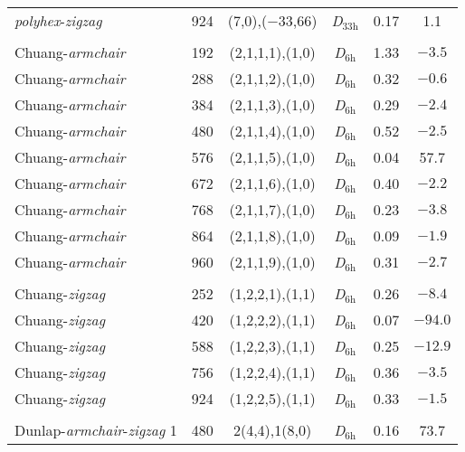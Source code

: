 \begin{table}[htbp!]
{\begin{tabular}{lccccS[table-format = 3.1]}
    \textit{polyhex}-\textit{zigzag} & 924   & (7,0),($-$33,66) & \textit{D}$_{33\text{h}}$  & 0.17  & 1.1 \\
          &       &       &       &       &  \\
    Chuang-\textit{armchair}& 192   & (2,1,1,1),(1,0) & \textit{D}$_{6\text{h}}$   & 1.33  & $\num{-3.5}$ \\
    Chuang-\textit{armchair}& 288   & (2,1,1,2),(1,0) & \textit{D}$_{6\text{h}}$   & 0.32  & $\num{-0.6}$ \\
    Chuang-\textit{armchair}& 384   & (2,1,1,3),(1,0) & \textit{D}$_{6\text{h}}$   & 0.29  & $\num{-2.4}$ \\
    Chuang-\textit{armchair}& 480   & (2,1,1,4),(1,0) & \textit{D}$_{6\text{h}}$   & 0.52  & $\num{-2.5}$ \\
    Chuang-\textit{armchair}& 576   & (2,1,1,5),(1,0) & \textit{D}$_{6\text{h}}$   & 0.04  & 57.7 \\
    Chuang-\textit{armchair}& 672   & (2,1,1,6),(1,0) & \textit{D}$_{6\text{h}}$   & 0.40  & $\num{-2.2}$ \\
    Chuang-\textit{armchair}& 768   & (2,1,1,7),(1,0) & \textit{D}$_{6\text{h}}$   & 0.23  & $\num{-3.8}$ \\
    Chuang-\textit{armchair}& 864   & (2,1,1,8),(1,0) & \textit{D}$_{6\text{h}}$   & 0.09  & $\num{-1.9}$ \\
    Chuang-\textit{armchair}& 960   & (2,1,1,9),(1,0) & \textit{D}$_{6\text{h}}$   & 0.31  & $\num{-2.7}$ \\
          &       &       &       &       &  \\
    Chuang-\textit{zigzag} & 252   & (1,2,2,1),(1,1) & \textit{D}$_{6\text{h}}$   & 0.26  & $\num{-8.4}$ \\
    Chuang-\textit{zigzag} & 420   & (1,2,2,2),(1,1) & \textit{D}$_{6\text{h}}$   & 0.07  & $\num{-94.0}$ \\
    Chuang-\textit{zigzag} & 588   & (1,2,2,3),(1,1) & \textit{D}$_{6\text{h}}$   & 0.25  & $\num{-12.9}$ \\
    Chuang-\textit{zigzag} & 756   & (1,2,2,4),(1,1) & \textit{D}$_{6\text{h}}$   & 0.36  & $\num{-3.5}$ \\
    Chuang-\textit{zigzag} & 924   & (1,2,2,5),(1,1) & \textit{D}$_{6\text{h}}$   & 0.33  & $\num{-1.5}$ \\
          &       &       &       &       &  \\
    Dunlap-\textit{armchair}-\textit{zigzag} 1& 480   & 2(4,4),1(8,0) & \textit{D}$_{6\text{h}}$   & 0.16  & 73.7 \\

\end{tabular}}
\end{table}
